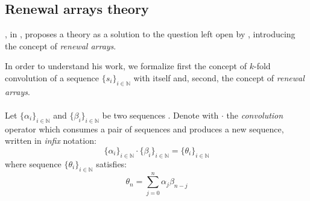 
\subsection{Renewal arrays theory}
\label{sec:back:to:the:basics:rogers}

\citeauthor{rogers:1977}, in \cite{rogers:1977}, proposes a theory
as a solution to the question left open by \citeauthor{shapiro:1976}, 
introducing the concept of \emph{renewal arrays}.

In order to understand his work, we formalize first the concept of $k$-fold
convolution of a sequence $\lbrace s_{i}\rbrace_{i\in\mathbb{N}}$ 
with itself and, second, the concept of \emph{renewal arrays}.
\\\\
Let $\lbrace \alpha_{i}\rbrace_{i\in\mathbb{N}}$ and 
$\lbrace \beta_{i}\rbrace_{i\in\mathbb{N}}$ be two sequences
. Denote
with $\cdot$ the \emph{convolution} operator which consumes a pair
of sequences and produces a new sequence, written in \emph{infix} 
notation:
\begin{displaymath}
    \lbrace \alpha_{i}\rbrace_{i\in\mathbb{N}}\cdot
    \lbrace \beta_{i}\rbrace_{i\in\mathbb{N}} =
    \lbrace \theta_{i}\rbrace_{i\in\mathbb{N}}
\end{displaymath}
where sequence  $\lbrace \theta_{i}\rbrace_{i\in\mathbb{N}}$ satisfies:
\begin{displaymath}
    \theta_{n}=\sum_{j=0}^{n}{\alpha_{j}\beta_{n-j}}
\end{displaymath}

